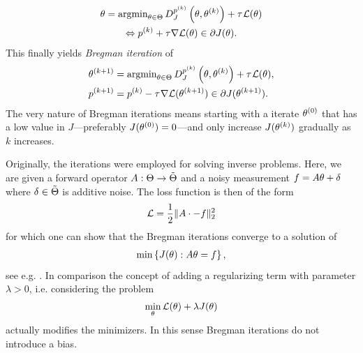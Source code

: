 %
\begin{gather}
\theta = \operatorname{argmin}_{\theta\in\Theta} D^{p^{(k)}}_J\left(\theta,\theta^{(k)}\right) + \tau^{}\mathcal{L}(\theta)
\\
\Leftrightarrow
p^{(k)} + \tau\nabla\mathcal{L}(\theta)\in \partial J(\theta). 
\end{gather}
%
This finally yields \emph{Bregman iteration} of \cite{osher2005iterative}
%
%
\begin{subequations}\label{eq:bregman_iteration}
\begin{align}
\theta^{(k+1)} &= \operatorname{argmin}_{\theta\in\Theta} D^{p^{(k)}}_J\left(\theta,\theta^{(k)}\right) + \tau^{}\mathcal{L}(\theta), \\
p^{(k+1)} &= p^{(k)} - \tau^{}\nabla\mathcal{L}(\theta^{(k+1)}) \in \partial J(\theta^{(k+1)}).
\end{align}
\end{subequations}
%
The very nature of Bregman iterations means starting with a iterate $\theta^{(0)}$ that has a low value in $J$---preferably $J(\theta^{(0)}) = 0$---and only increase $J(\theta^{(k)})$ gradually as $k$ increases.
%
\begin{remark}{}{}
Originally, the iterations were employed for solving inverse problems. Here, we are given a forward operator $A:\Theta\to\tilde{\Theta}$ and a noisy measurement $f= A\theta +\delta$ where $\delta\in \tilde{\Theta}$ is additive noise. The loss function is then of the form
%
\begin{align*}
\mathcal{L} = \frac{1}{2}\|A\cdot - f\|^2_2
\end{align*}
%
for which one can show that the Bregman iterations converge to a solution of
%
\begin{align}\label{eq:Bregexact}
\min \left\{J(\theta): A\theta = f\right\},
\end{align}
%
see e.g. \cite{osher2005iterative}. In comparison the concept of adding a regularizing term with parameter $\lambda>0$, i.e. considering the problem
%
\begin{align*}
\min_\theta \mathcal{L}(\theta) + \lambda J(\theta) 
\end{align*}
%
actually modifies the minimizers. In this sense Bregman iterations do not introduce a bias.
\end{remark}
%
%
